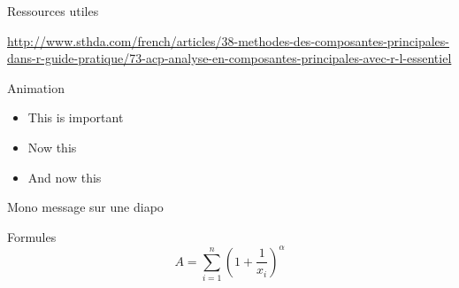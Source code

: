 \documentclass{beamer}
\begin{document}
\begin{frame}{Ressources utiles}


\url{http://www.sthda.com/french/articles/38-methodes-des-composantes-principales-dans-r-guide-pratique/73-acp-analyse-en-composantes-principales-avec-r-l-essentiel}

\end{frame}


\begin{frame}{Animation}
  \begin{itemize}[<+- | alert@+>]
    \item \alert<4>{This is important}
    \item Now this
    \item And now this
  \end{itemize}
\end{frame}



\begin{frame}[standout]
Mono message sur une diapo
\end{frame}


\begin{frame}{Formules}
  \begin{equation*}
    A = \sum_{i=1}^{n} \left(1 + \frac{1}{x_i}\right)^{\alpha}
  \end{equation*}
\end{frame}
\end{document}
